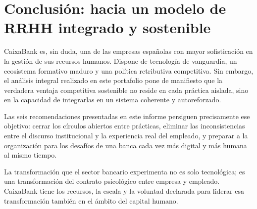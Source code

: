 \section{Conclusión: hacia un modelo de RRHH integrado y sostenible}

CaixaBank es, sin duda, una de las empresas españolas con mayor sofisticación
en la gestión de sus recursos humanos. Dispone de tecnología de vanguardia,
un ecosistema formativo maduro y una política retributiva competitiva. Sin
embargo, el análisis integral realizado en este portafolio pone de manifiesto
que la verdadera ventaja competitiva sostenible no reside en cada práctica
aislada, sino en la capacidad de integrarlas en un sistema coherente y
autoreforzado.

Las seis recomendaciones presentadas en este informe persiguen precisamente
ese objetivo: cerrar los círculos abiertos entre prácticas, eliminar las
inconsistencias entre el discurso institucional y la experiencia real del
empleado, y preparar a la organización para los desafíos de una banca cada
vez más digital y más humana al mismo tiempo.

La transformación que el sector bancario experimenta no es solo tecnológica;
es una transformación del contrato psicológico entre empresa y empleado.
CaixaBank tiene los recursos, la escala y la voluntad declarada para liderar
esa transformación también en el ámbito del capital humano.

\endinput

